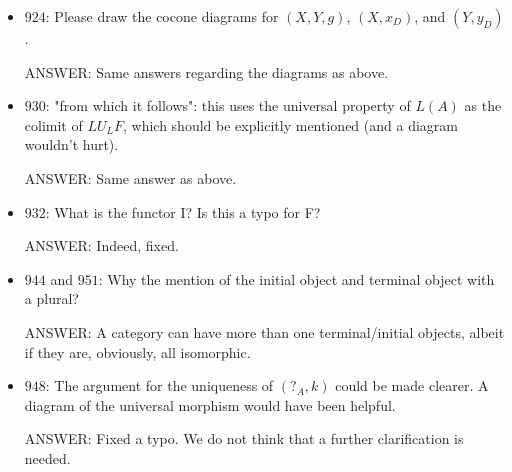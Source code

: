 \documentclass[english,11pt,a4paper]{article}
\begin{document}
\begin{itemize}
\item $924$: Please draw the cocone diagrams for $(X,Y,g)$, $(X,{x_D})$, and $(Y,{y_D})$.

ANSWER: Same answers regarding the diagrams as above.

\item $930$: "from which it follows": this uses the universal property of $L(A)$ as the colimit of $LU_LF$, which should be explicitly mentioned (and a diagram wouldn't hurt).

ANSWER: Same answer as above.

\item $932$: What is the functor I? Is this a typo for F?

ANSWER: Indeed, fixed.

\item $944$ and $951$: Why the mention of the initial object and terminal object with a plural?

ANSWER: A category can have more than one terminal/initial objects, albeit if they are, obviously, all isomorphic.

\item $948$: The argument for the uniqueness of $(?_A,k)$ could be made clearer. A diagram of the universal morphism would have been helpful.

ANSWER: Fixed a typo. We do not think that a further clarification is needed.

 \end{itemize}
\end{document}
